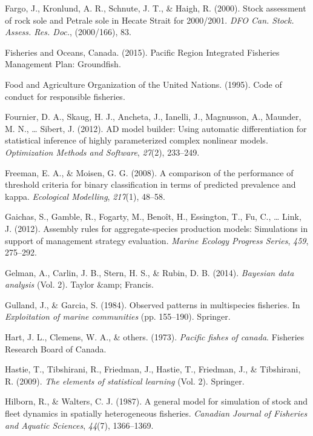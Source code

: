 \documentclass[12pt,]{scrartcl}
\begin{document}
\hypertarget{ref-fargo2000stock-asse}{}
Fargo, J., Kronlund, A. R., Schnute, J. T., \& Haigh, R. (2000). Stock
assessment of rock sole and Petrale sole in Hecate Strait for 2000/2001.
\emph{DFO Can. Stock. Assess. Res. Doc.}, (2000/166), 83.

\hypertarget{ref-PRIFMP2015}{}
Fisheries and Oceans, Canada. (2015). Pacific Region Integrated
Fisheries Management Plan: Groundfish.

\hypertarget{ref-FAO1995}{}
Food and Agriculture Organization of the United Nations. (1995). Code of
conduct for responsible fisheries.

\hypertarget{ref-fournier2012ad}{}
Fournier, D. A., Skaug, H. J., Ancheta, J., Ianelli, J., Magnusson, A.,
Maunder, M. N., \ldots{} Sibert, J. (2012). AD model builder: Using
automatic differentiation for statistical inference of highly
parameterized complex nonlinear models. \emph{Optimization Methods and
Software}, \emph{27}(2), 233--249.

\hypertarget{ref-freeman2008comparison}{}
Freeman, E. A., \& Moisen, G. G. (2008). A comparison of the performance
of threshold criteria for binary classification in terms of predicted
prevalence and kappa. \emph{Ecological Modelling}, \emph{217}(1),
48--58.

\hypertarget{ref-gaichas2012assembly}{}
Gaichas, S., Gamble, R., Fogarty, M., Benoît, H., Essington, T., Fu, C.,
\ldots{} Link, J. (2012). Assembly rules for aggregate-species
production models: Simulations in support of management strategy
evaluation. \emph{Marine Ecology Progress Series}, \emph{459}, 275--292.

\hypertarget{ref-gelman2014bayesian}{}
Gelman, A., Carlin, J. B., Stern, H. S., \& Rubin, D. B. (2014).
\emph{Bayesian data analysis} (Vol. 2). Taylor \&amp; Francis.

\hypertarget{ref-gulland1984observed}{}
Gulland, J., \& Garcia, S. (1984). Observed patterns in multispecies
fisheries. In \emph{Exploitation of marine communities} (pp. 155--190).
Springer.

\hypertarget{ref-hart1973pacific}{}
Hart, J. L., Clemens, W. A., \& others. (1973). \emph{Pacific fishes of
canada}. Fisheries Research Board of Canada.

\hypertarget{ref-hastie2009elements}{}
Hastie, T., Tibshirani, R., Friedman, J., Hastie, T., Friedman, J., \&
Tibshirani, R. (2009). \emph{The elements of statistical learning} (Vol.
2). Springer.

\hypertarget{ref-hilborn1987general}{}
Hilborn, R., \& Walters, C. J. (1987). A general model for simulation of
stock and fleet dynamics in spatially heterogeneous fisheries.
\emph{Canadian Journal of Fisheries and Aquatic Sciences}, \emph{44}(7),
1366--1369.
\end{document}
